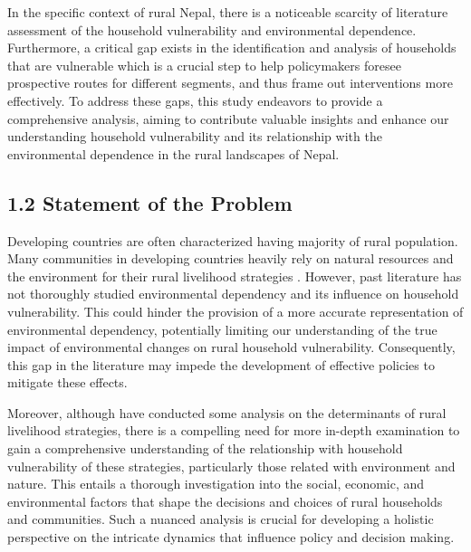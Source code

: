 In the specific context of rural Nepal, there is a noticeable scarcity of literature assessment of the household vulnerability and environmental dependence. Furthermore, a critical gap exists in the identification and analysis of households that are vulnerable which is a crucial step to help policymakers foresee prospective routes for different segments, and thus frame out interventions more effectively. To address these gaps, this study endeavors to provide a comprehensive analysis, aiming to contribute valuable insights and enhance our understanding household vulnerability and its relationship with the environmental dependence in the rural landscapes of Nepal.

\subsection*{1.2 Statement of the Problem }
\renewcommand{\thepage}{\arabic{page}}
Developing countries are often characterized having majority of rural population. Many communities in developing countries heavily rely on natural resources and the environment for their rural livelihood strategies \citep{adger2000social, ahmadpour2020factors, chambers1992sustainable, ellis1999rural}. However, past literature has not thoroughly studied environmental dependency and its influence on household vulnerability. This could hinder the provision of a more accurate representation of environmental dependency, potentially limiting our understanding of the true impact of environmental changes on rural household vulnerability. Consequently, this gap in the literature may impede the development of effective policies to mitigate these effects.

Moreover, although \citep{mao2020rural, shan2020determinants, lorato2019determinants} have conducted some analysis on the determinants of rural livelihood strategies, there is a compelling need for more in-depth examination to gain a comprehensive understanding of the relationship with household vulnerability of these strategies, particularly those related with environment and nature. This entails a thorough investigation into the social, economic, and environmental factors that shape the decisions and choices of rural households and communities. Such a nuanced analysis is crucial for developing a holistic perspective on the intricate dynamics that influence policy and decision making.

